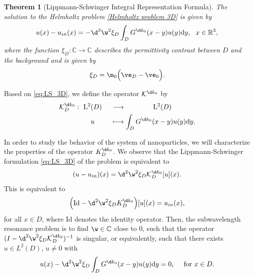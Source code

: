 \documentclass[10pt]{article}
\numberwithin{equation}{section}
\newtheorem{theorem}{Theorem}[section]
\newcommand{\upd}{\mathrm{d}}
\begin{document}
\begin{theorem}[Lippmann-Schwinger Integral Representation Formula] \label{Integral representation}
    The solution to the Helmholtz problem \eqref{Helmholtz problem 3D} is given by
    \begin{align}\label{eq:LS_3D}
        u(x)-u_{in}(x) = -\d^2 \w^2 \xi_D \int_D G^{\d k_0}(x-y) u(y) \upd y, \ \ x\in\mathbb{R}^3,
    \end{align} 
    where the function $\xi_D:\mathbb{C}\to\mathbb{C}$ describes the permittivity contrast between $D$ and the background and is given by
    \begin{align}
        \xi_D = \m_0\Big(\ve_D - \ve_0\Big).
    \end{align}
\end{theorem}

Based on \eqref{eq:LS_3D}, we define the operator $\mathcal{K}^{\d k_0}$ by
\begin{align}
    \begin{aligned}
        \mathcal{K}^{\d k_0}_D: \ \mathrm{L}^{2}&(D) \ &&\longrightarrow \qquad \qquad  \mathrm{L}^{2}(D) \\ 
        &u &&\longmapsto  \int_D G^{\d k_0}(x-y) u(y) \upd y. 
    \end{aligned}
\end{align}

In order to study the behavior of the system of nanoparticles, we will characterize the properties of the operator $K^{\d k_0}_D$. We observe that the Lippmann-Schwinger formulation \eqref{eq:LS_3D} of the problem is equivalent to
\begin{align*}
    (u-u_{in})(x) = \d^2 \w^2 \xi_D \mathcal{K}^{\d k_0}_D[u](x).
\end{align*}
This is equivalent to
\begin{align*}
    \Big(\text{Id} - \d^2 \w^2 \xi_D K^{\d k_0}_D\Big)[u](x) = u_{in}(x), 
\end{align*}
for all $x\in D$, where $\text{Id}$ denotes the identity operator. Then, the subwavelength resonance problem is to find $\w \in \mathbb{C}$ close to 0, such that the operator $(I - \d^2 \w^2 \xi_D \mathcal{K}^{\d k_0}_D)^{-1}$ is singular, or equivalently, such that there exists $u \in L^2(D)$, $u \ne 0$ with
\begin{align}\label{pb}
    u(x) - \d^2 \w^2 \xi_D \int_D G^{\d k_0}(x-y) u(y) \upd y = 0, \ \ \ \text{ for } x \in D.
\end{align}
\end{document}
